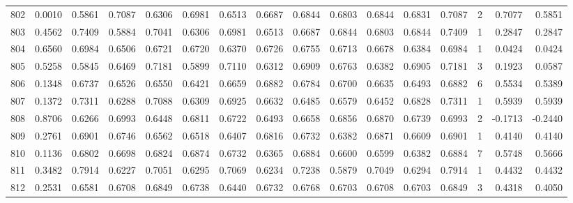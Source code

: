 \begin{tabular}{lrrrrrrrrrrrrrrr}
802 &      0.0010 &  0.5861 &  0.7087 &  0.6306 &  0.6981 &  0.6513 &  0.6687 &  0.6844 &  0.6803 &  0.6844 &   0.6831 &     0.7087 &      2 &                    0.7077 &                     0.5851 \\
803 &      0.4562 &  0.7409 &  0.5884 &  0.7041 &  0.6306 &  0.6981 &  0.6513 &  0.6687 &  0.6844 &  0.6803 &   0.6844 &     0.7409 &      1 &                    0.2847 &                     0.2847 \\
804 &      0.6560 &  0.6984 &  0.6506 &  0.6721 &  0.6720 &  0.6370 &  0.6726 &  0.6755 &  0.6713 &  0.6678 &   0.6384 &     0.6984 &      1 &                    0.0424 &                     0.0424 \\
805 &      0.5258 &  0.5845 &  0.6469 &  0.7181 &  0.5899 &  0.7110 &  0.6312 &  0.6909 &  0.6763 &  0.6382 &   0.6905 &     0.7181 &      3 &                    0.1923 &                     0.0587 \\
806 &      0.1348 &  0.6737 &  0.6526 &  0.6550 &  0.6421 &  0.6659 &  0.6882 &  0.6784 &  0.6700 &  0.6635 &   0.6493 &     0.6882 &      6 &                    0.5534 &                     0.5389 \\
807 &      0.1372 &  0.7311 &  0.6288 &  0.7088 &  0.6309 &  0.6925 &  0.6632 &  0.6485 &  0.6579 &  0.6452 &   0.6828 &     0.7311 &      1 &                    0.5939 &                     0.5939 \\
808 &      0.8706 &  0.6266 &  0.6993 &  0.6448 &  0.6811 &  0.6722 &  0.6493 &  0.6658 &  0.6856 &  0.6870 &   0.6739 &     0.6993 &      2 &                   -0.1713 &                    -0.2440 \\
809 &      0.2761 &  0.6901 &  0.6746 &  0.6562 &  0.6518 &  0.6407 &  0.6816 &  0.6732 &  0.6382 &  0.6871 &   0.6609 &     0.6901 &      1 &                    0.4140 &                     0.4140 \\
810 &      0.1136 &  0.6802 &  0.6698 &  0.6824 &  0.6874 &  0.6732 &  0.6365 &  0.6884 &  0.6600 &  0.6599 &   0.6382 &     0.6884 &      7 &                    0.5748 &                     0.5666 \\
811 &      0.3482 &  0.7914 &  0.6227 &  0.7051 &  0.6295 &  0.7069 &  0.6234 &  0.7238 &  0.5879 &  0.7049 &   0.6294 &     0.7914 &      1 &                    0.4432 &                     0.4432 \\
812 &      0.2531 &  0.6581 &  0.6708 &  0.6849 &  0.6738 &  0.6440 &  0.6732 &  0.6768 &  0.6703 &  0.6708 &   0.6703 &     0.6849 &      3 &                    0.4318 &                     0.4050 \\

\end{tabular}
